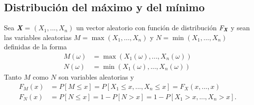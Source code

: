 \subsection{Distribución del máximo y del mínimo}

Sea \textit{\textbf{X}} = $(X_1,...,X_n)$ un vector aleatorio con función de distribución $F_{\textit{\textbf{X}}}$ y sean las variables aleatorias $M = \max(X_1,...,X_n)$ y $N = \min(X_1,...,X_n)$ definidas de la forma
\begin{align*}
    M(\omega) & = \max(X_1(\omega),...,X_n(\omega)) \\
    N(\omega) & = \min(X_1(\omega),...,X_n(\omega))
\end{align*}
Tanto $M$ como $N$ son variables aleatorias y
\begin{align*}
    F_M(x) & = P[M \leq x] = P[X_1 \leq x,..., X_n \leq x] = F_X(x,...,x) \\
    F_N(x) & = P[N \leq x] = 1 - P[N > x] = 1 - P[X_1 > x,...,X_n > x].
\end{align*}
